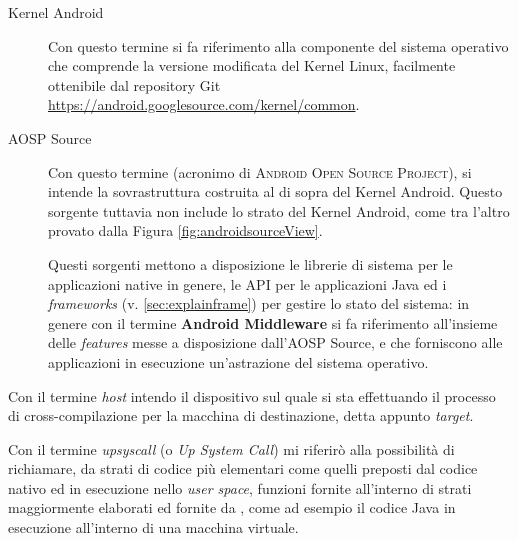 \begin{description}
\item[Kernel Android] Con questo termine si fa riferimento alla componente del	
	sistema operativo che comprende la versione modificata del Kernel Linux,
	facilmente ottenibile dal repository Git \url{https://android.googlesource.com/kernel/common}.
\item[AOSP Source] Con questo termine (acronimo di \textsc{Android Open Source Project}),
	si intende  la sovrastruttura costruita al 
	di sopra del Kernel Android. Questo sorgente tuttavia non include lo strato 
	del Kernel Android, come tra l'altro provato dalla Figura \vref{fig:androidsourceView}.
	
	Questi sorgenti mettono a disposizione le librerie di sistema per le
	applicazioni native in genere, le API per le applicazioni Java ed i 
	\textit{frameworks} (v. \ref{sec:explainframe}) per gestire lo stato del sistema: in genere con il termine
	\textbf{Android Middleware} \parencite{art:middleware} si fa riferimento all'insieme delle \textit{features}
	messe a disposizione dall'AOSP Source, e che forniscono alle applicazioni
	in esecuzione un'astrazione del sistema operativo.
\end{description}

Con il termine \textit{host} intendo il dispositivo sul quale si sta effettuando
il processo di cross-compilazione per la macchina di destinazione, detta
appunto \textit{target}.
\bigskip

Con il termine \textit{upsyscall} (o \textit{Up System Call}) mi riferirò alla possibilità
di richiamare, da strati di codice più elementari come quelli preposti dal codice
nativo ed in esecuzione nello \textit{user space}, funzioni fornite all'interno di 
strati maggiormente elaborati ed fornite da , come 
ad esempio il codice Java in esecuzione all'interno di una macchina virtuale.

